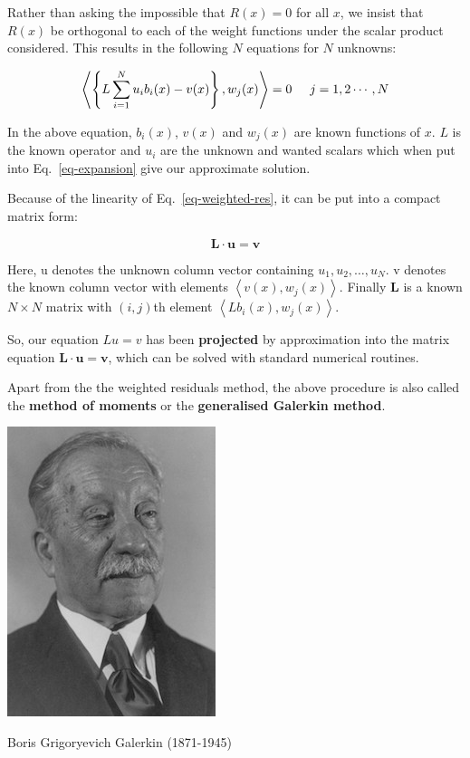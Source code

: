Rather than asking the impossible that $R(x)=0$ for all $x$, we insist that $R(x)$ be orthogonal to each of the weight functions under the scalar product considered. This results in the following $N$ equations for $N$ unknowns:

\begin{equation}
\left\langle \left\{ L \sum_{i=1}^N u_i b_i(x) - v(x)  \right\}, w_j(x) \right\rangle = 0 \hspace{0.5cm} j=1,2\cdots,N \label{eq-weighted-res}
\end{equation}

In the above equation, $b_i(x)$, $v(x)$ and $w_j(x)$ are known functions of $x$. $L$ is the known operator and $u_i$ are the unknown and wanted scalars which when put into Eq.~\ref{eq-expansion} give our approximate solution.

Because of the linearity of Eq.~\ref{eq-weighted-res}, it can be put into a compact matrix form:

\begin{equation}
{\mathbf L} \cdot {\mathbf u} = {\mathbf v}
\end{equation} 

Here, {\mathbf u} denotes the unknown column vector containing $u_1, u_2, \hdots, u_N$. {\mathbf v} denotes the known column vector with elements $\left\langle v(x), w_j(x) \right\rangle$. Finally ${\mathbf L}$ is a known $N \times N$ matrix with $(i,j)$th element $\left\langle L b_i(x), w_j(x) \right\rangle$.

So, our equation $Lu=v$ has been \textbf{projected} by approximation into the matrix equation ${\mathbf L} \cdot {\mathbf u} = {\mathbf v}$, which can be solved with standard numerical routines.

Apart from the the weighted residuals method, the above procedure is also called the \textbf{method of moments} or the \textbf{generalised Galerkin method}.

\begin{marginfigure}[-.0cm]
  \includegraphics{numeric/figures/b_galerkin}
  \caption{Boris Grigoryevich Galerkin (1871-1945)}
\end{marginfigure}

